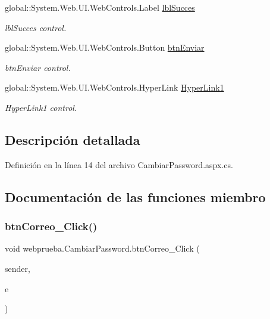 \begin{DoxyCompactItemize}
global\+::\+System.\+Web.\+U\+I.\+Web\+Controls.\+Label \mbox{\hyperlink{classwebprueba_1_1_cambiar_password_a1600f4e59eaffb66e7bb51a4b8a38389}{lbl\+Succes}}
\begin{DoxyCompactList}\small\item\em lbl\+Succes control. \end{DoxyCompactList}\item 
global\+::\+System.\+Web.\+U\+I.\+Web\+Controls.\+Button \mbox{\hyperlink{classwebprueba_1_1_cambiar_password_a411bf0459849ba353bc2434a4b50bd89}{btn\+Enviar}}
\begin{DoxyCompactList}\small\item\em btn\+Enviar control. \end{DoxyCompactList}\item 
global\+::\+System.\+Web.\+U\+I.\+Web\+Controls.\+Hyper\+Link \mbox{\hyperlink{classwebprueba_1_1_cambiar_password_ab39f72218b6d0254d96d30afe73f609d}{Hyper\+Link1}}
\begin{DoxyCompactList}\small\item\em Hyper\+Link1 control. \end{DoxyCompactList}\end{DoxyCompactItemize}


\subsection{Descripción detallada}


Definición en la línea 14 del archivo Cambiar\+Password.\+aspx.\+cs.



\subsection{Documentación de las funciones miembro}
\mbox{\label{classwebprueba_1_1_cambiar_password_a763f5a890b60db92bb1e33dba70b9a11}} 
\subsubsection{\texorpdfstring{btnCorreo\_Click()}{btnCorreo\_Click()}\hspace{0.1cm}{\footnotesize\ttfamily [1/2]}}
{\footnotesize\ttfamily void webprueba.\+Cambiar\+Password.\+btn\+Correo\+\_\+\+Click (\begin{DoxyParamCaption}\item[{object}]{sender,  }\item[{Event\+Args}]{e }\end{DoxyParamCaption})\hspace{0.3cm}{\ttfamily [protected]}}



